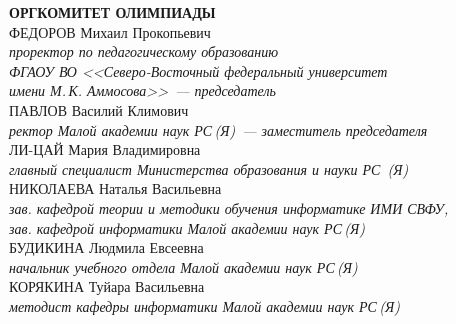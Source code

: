 {\fontsize{11pt}{13.2pt}


\newpage\noindent
\textbf{ОРГКОМИТЕТ ОЛИМПИАДЫ}
\\[2mm]
ФЕДОРОВ Михаил Прокопьевич\\ 
\textit{проректор по педагогическому образованию \\ 
ФГАОУ ВО <<Северо-Восточный федеральный университет \\
\textit{имени М.\,К. Аммосова>>~--- председатель}}
\\[2mm]
ПАВЛОВ Василий Климович  \\
\textit{ректор Малой академии наук РС\,(Я)~--- 
заместитель председателя}
\\[2mm]
ЛИ-ЦАЙ Мария Владимировна  \\
\textit{главный специалист Министерства образования и науки РС~(Я)}
\\[2mm]
НИКОЛАЕВА Наталья Васильевна \\
\textit
{зав. кафедрой теории и методики обучения информатике ИМИ СВФУ, \\
зав. кафедрой информатики Малой академии наук РС\,(Я)}
\\[2mm]
БУДИКИНА Людмила Евсеевна \\
\textit
{начальник учебного отдела Малой академии наук РС\,(Я)} 
\\[2mm]
КОРЯКИНА Туйара Васильевна \\
\textit{методист кафедры информатики Малой академии наук РС\,(Я)}
\\[2mm]


}
